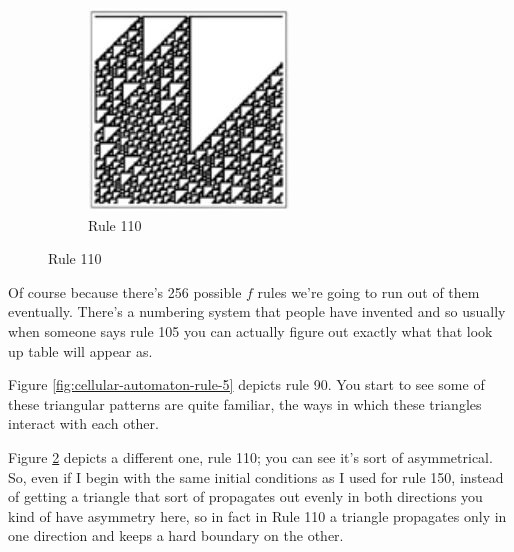 \documentclass[]{article}
\begin{document}
\begin{figure}[H]
\begin{center}
\begin{subfigure}[t]{0.3\textwidth}
		\end{subfigure}
		\begin{subfigure}[t]{0.3\textwidth}
			\caption{Rule 110}\label{fig:cellular-automaton-rule-6}
			\includegraphics[width=\textwidth]{cellular-automaton-rule-6}
		\end{subfigure}
	\end{center}
\end{figure}
Of course because there's 256 possible $f$ rules
we're going to run out of them eventually.
There's a numbering system that people have invented and so usually when someone says rule 105 you can actually figure out exactly what that look up table will appear as.

Figure \ref{fig:cellular-automaton-rule-5} depicts rule 90.
You start to see some of these triangular patterns are quite familiar, the ways in which these triangles interact with each other.

Figure \ref{fig:cellular-automaton-rule-6} depicts a different one,
rule 110; you can see it's sort of asymmetrical.
So, even if I begin with the same initial conditions as I used for rule 150, instead of getting a triangle that sort of propagates out evenly in both directions
you kind of have asymmetry here, so in fact in Rule 110 a triangle propagates only in one direction and keeps a hard boundary on the other.
\end{document}
